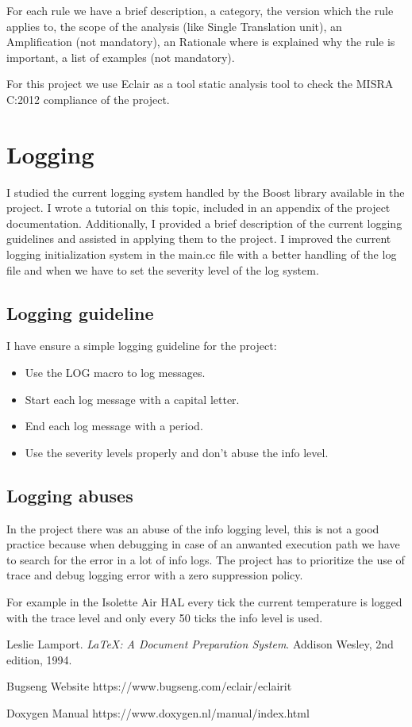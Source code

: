 \documentclass[a4paper, 12pt]{article}
\begin{document}
For each rule we have a brief description, a category, the version which the rule applies to, the scope of the analysis (like Single Translation unit), 
an Amplification (not mandatory), an Rationale where is explained why the rule is important, a list of examples (not mandatory).

For this project we use Eclair \cite{Eclair} as a tool static analysis tool to check the MISRA C:2012 compliance of the project.

\section{Logging}

I studied the current logging system handled by the Boost library available in the project. 
I wrote a tutorial on this topic, included in an appendix of the project documentation. Additionally, I provided a brief description of the current logging guidelines and assisted in applying them to the project.
I improved the current logging initialization system in the main.cc file with a better handling of the log file and when we have to set the 
severity level of the log system.

\subsection{Logging guideline}

I have ensure a simple logging guideline for the project:

\begin{itemize}
    \item Use the LOG macro to log messages.
    \item Start each log message with a capital letter.
    \item End each log message with a period.
    \item Use the severity levels properly and don't abuse the info level.
\end{itemize}

\subsection{Logging abuses}
In the project there was an abuse of the info logging level, this is not a good practice because when debugging in case of an anwanted execution path we have to search for the error in a lot of info logs.
The project has to prioritize the use of trace and debug logging error with a zero suppression policy.

For example in the Isolette Air HAL every tick the current temperature is logged with the trace level and only every 50 ticks the info level is used.

\begin{thebibliography}{9}
    Leslie Lamport.
    \textit{LaTeX: A Document Preparation System}.
    Addison Wesley, 2nd edition, 1994.

    Bugseng Website
    https://www.bugseng.com/eclair/eclairit

    Doxygen Manual
    https://www.doxygen.nl/manual/index.html

\end{thebibliography}
\end{document}
